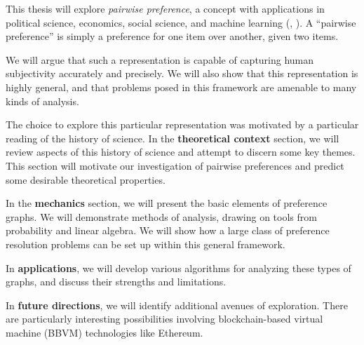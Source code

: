 This thesis will explore \textit{pairwise preference}, a concept with applications in political science, economics, social science, and machine learning (\cite{jordan}, \cite{arrow}).
A ``pairwise preference'' is simply a preference for one item over another, given two items.

We will argue that such a representation is capable of capturing human subjectivity accurately and precisely.
We will also show that this representation is highly general, and that problems posed in this framework are amenable to many kinds of analysis.

\bigskip

The choice to explore this particular representation was motivated by a particular reading of the history of science.
In the \textbf{theoretical context} section, we will review aspects of this history of science and attempt to discern some key themes.
This section will motivate our investigation of pairwise preferences and predict some desirable theoretical properties.

In the \textbf{mechanics} section, we will present the basic elements of preference graphs.
We will demonstrate methods of analysis, drawing on tools from probability and linear algebra.
We will show how a large class of preference resolution problems can be set up within this general framework.

In \textbf{applications}, we will develop various algorithms for analyzing these types of graphs, and discuss their strengths and limitations.

In \textbf{future directions}, we will identify additional avenues of exploration. There are particularly interesting possibilities involving blockchain-based virtual machine (BBVM) technologies like Ethereum.